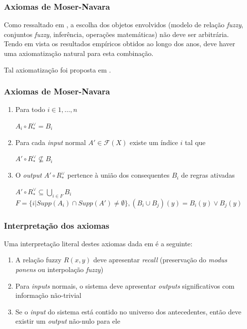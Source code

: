 \documentclass{beamer}
\theoremstyle{definition}
\begin{document}
\begin{frame}
\frametitle{Axiomas de Moser-Navara}
Como ressaltado em \cite{p2}, a escolha dos objetos envolvidos (modelo de relação \textit{fuzzy}, conjuntos \textit{fuzzy}, inferência, operações matemáticas) não deve ser arbitrária. Tendo em vista os resultados empíricos obtidos ao longo dos anos, deve haver uma axiomatização natural para esta combinação.\par
Tal axiomatização foi proposta em \cite{p14}.
\end{frame}

\begin{frame}
\frametitle{Axiomas de Moser-Navara}
\begin{enumerate}
\item Para todo $i \in {1,\dots,n}$
\begin{center}
$A_{i} \circ R^{\vee}_{\ast} = B_{i}$
\end{center}

\hfill

\item Para cada \textit{input} normal $A' \in \mathcal{F}(X)$ existe um índice $i$ tal que
\begin{center}
$A' \circ R^{\vee}_{\ast} \nsubseteq B_{i}$
\end{center}

\hfill

\item O \textit{output} $A' \circ R^{\vee}_{\ast}$ pertence à união dos consequentes $B_{i}$ de regras ativadas
\begin{center}
$A' \circ R^{\vee}_{\ast} \subseteq \bigcup\limits_{i \in F} B_{i}$\\
$F = \{i|Supp(A_{i})\cap Supp(A') \neq \emptyset\}, (B_{i} \cup B_{j})(y) = B_{i}(y) \vee B_{j}(y)$
\end{center}
\end{enumerate}
\end{frame}


\begin{frame}
\frametitle{Interpretação dos axiomas}
Uma interpretação literal destes axiomas dada em \cite{p2} é a seguinte:
\begin{enumerate}
\item A relação fuzzy $R(x,y)$ deve apresentar \textit{recall} (preservação do \textit{modus ponens} ou interpolação \textit{fuzzy})

\hfill

\item Para \textit{inputs} normais, o sistema deve apresentar \textit{outputs} significativos com informação não-trivial

\hfill

\item Se o \textit{input} do sistema está contido no universo dos antecedentes, então deve existir um \textit{output} não-nulo para ele
\end{enumerate}
\end{frame}
\end{document}
